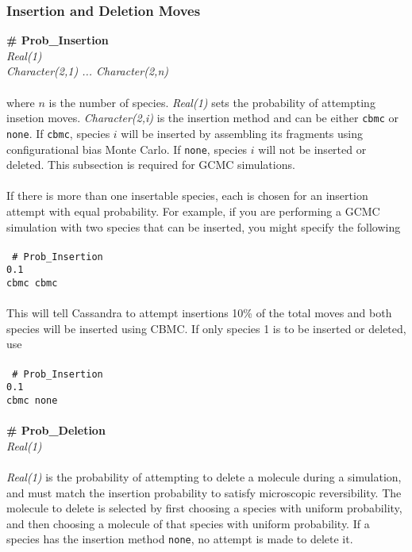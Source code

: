 \subsubsection{Insertion and Deletion Moves}
{\bf \# Prob\_Insertion} \\
{\it Real(1)} \\
{\it Character(2,1) ... Character(2,n)} \\ \\
%
where $n$ is the number of species. 
{\it Real(1)} sets the probability of attempting insetion moves. 
{\it Character(2,i)} is the insertion method and can be either \texttt{cbmc} or \texttt{none}. 
If \texttt{cbmc}, species $i$ will be inserted by assembling its 
fragments using configurational bias Monte Carlo.
If \texttt{none}, species $i$ will not be inserted or deleted.
This subsection is required for GCMC simulations. \\ \\
%
If there is more than one insertable species, each is chosen for an insertion attempt with equal probability. 
For example, if you are performing a GCMC simulation with two species that can 
be inserted, you might specify the following \\ \\ 
%
\texttt{
\# Prob\_Insertion \\
0.1 \\
cbmc cbmc} \\ \\ 
%
This will tell Cassandra to attempt insertions 10\% of the total moves and
both species will be inserted using CBMC.
If only species 1 is to be inserted or deleted, use \\ \\
%
\texttt{
\# Prob\_Insertion \\
0.1 \\
cbmc none} \\ \\ 
%
%
%
{\bf \# Prob\_Deletion} \\
{\it Real(1)} \\ \\
%
{\it Real(1)} is the probability of attempting to delete a molecule during a simulation, 
and must match the insertion probability to satisfy microscopic reversibility.
The molecule to delete is selected by first choosing a species with uniform probability, 
and then choosing a molecule of that species with uniform probability.
If a species has the insertion method \texttt{none}, no attempt is made to delete it. 
